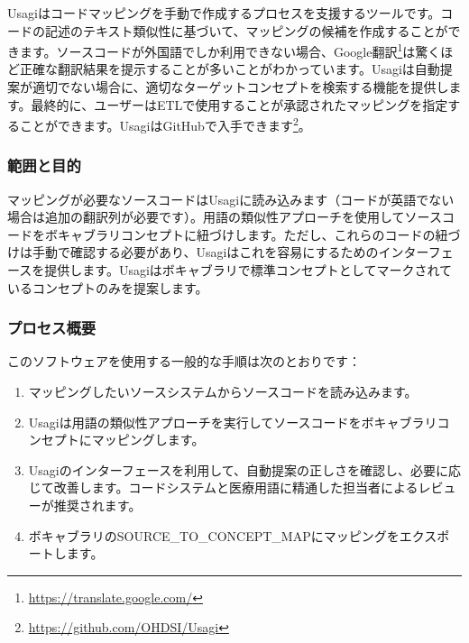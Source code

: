 \documentclass[
  11pt]{book}
\providecommand{\tightlist}{%
  \setlength{\itemsep}{0pt}\setlength{\parskip}{0pt}}
\theoremstyle{definition}
\theoremstyle{definition}
\theoremstyle{definition}
\theoremstyle{definition}
\theoremstyle{remark}
\begin{document}
Usagiはコードマッピングを手動で作成するプロセスを支援するツールです。コードの記述のテキスト類似性に基づいて、マッピングの候補を作成することができます。ソースコードが外国語でしか利用できない場合、Google翻訳\footnote{\url{https://translate.google.com/}}は驚くほど正確な翻訳結果を提示することが多いことがわかっています。Usagiは自動提案が適切でない場合に、適切なターゲットコンセプトを検索する機能を提供します。最終的に、ユーザーはETLで使用することが承認されたマッピングを指定することができます。UsagiはGitHubで入手できます\footnote{\url{https://github.com/OHDSI/Usagi}}。  

\subsubsection*{範囲と目的}\label{ux7bc4ux56f2ux3068ux76eeux7684-2}

マッピングが必要なソースコードはUsagiに読み込みます（コードが英語でない場合は追加の翻訳列が必要です）。用語の類似性アプローチを使用してソースコードをボキャブラリコンセプトに紐づけします。ただし、これらのコードの紐づけは手動で確認する必要があり、Usagiはこれを容易にするためのインターフェースを提供します。Usagiはボキャブラリで標準コンセプトとしてマークされているコンセプトのみを提案します。

\subsubsection*{プロセス概要}\label{ux30d7ux30edux30bbux30b9ux6982ux8981-2}

このソフトウェアを使用する一般的な手順は次のとおりです：

\begin{enumerate}
\def\labelenumi{\arabic{enumi}.}
\tightlist
\item
  マッピングしたいソースシステムからソースコードを読み込みます。
\item
  Usagiは用語の類似性アプローチを実行してソースコードをボキャブラリコンセプトにマッピングします。
\item
  Usagiのインターフェースを利用して、自動提案の正しさを確認し、必要に応じて改善します。コードシステムと医療用語に精通した担当者によるレビューが推奨されます。
\item
  ボキャブラリのSOURCE\_TO\_CONCEPT\_MAPにマッピングをエクスポートします。
\end{enumerate}
\end{document}
